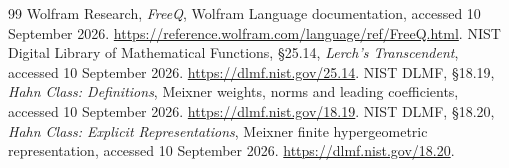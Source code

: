 \documentclass[11pt,a4paper]{article}
\theoremstyle{remark}\newtheorem{remark}[theorem]{Remark}
\begin{document}
\begin{thebibliography}{99}
 Wolfram Research, \emph{FreeQ}, Wolfram Language documentation,
accessed 10 September 2026.
\url{https://reference.wolfram.com/language/ref/FreeQ.html}.
 NIST Digital Library of Mathematical Functions,
\S25.14, \emph{Lerch's Transcendent}, accessed 10 September 2026.
\url{https://dlmf.nist.gov/25.14}.
 NIST DLMF, \S18.19, \emph{Hahn Class: Definitions},
Meixner weights, norms and leading coefficients, accessed 10 September 2026.
\url{https://dlmf.nist.gov/18.19}.
 NIST DLMF, \S18.20, \emph{Hahn Class: Explicit
Representations}, Meixner finite hypergeometric representation, accessed
10 September 2026. \url{https://dlmf.nist.gov/18.20}.
\end{thebibliography}
\end{document}

